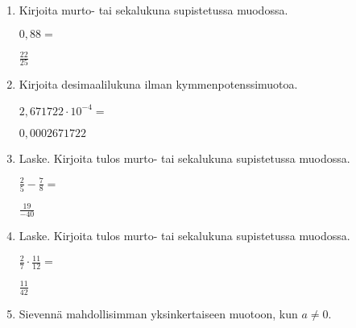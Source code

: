 \documentclass[finnish, a4paper, 12pt]{article}
\begin{document}
	\begin{enumerate}[leftmargin=*]
		\setlength\itemsep{1em}
		
		\item %
		Kirjoita murto- tai sekalukuna supistetussa muodossa. 
		
		\(
		0{,}88 = 
		\) %
		
		\begin{version:withAnswers}
		\( \frac{22}{25} \)
		\end{version:withAnswers}

		\vspace{8pt}
		
		\item %
		Kirjoita desimaalilukuna ilman kymmenpotenssimuotoa. 
		
		\(
		2{,}671722\cdot 10^{-4} = 
		\) %
		\begin{version:withAnswers}
		\( 0,0002671722 \)
		\end{version:withAnswers}	
		\vspace{8pt}
		
		\item %
		Laske. Kirjoita tulos murto- tai sekalukuna supistetussa muodossa.
		
		\(
		\displaystyle
		\frac{2}{5}-\frac{7}{8} = 
		\) %
		\begin{version:withAnswers}
		\( \frac{19}{-40} \)
		\end{version:withAnswers}	
		
		\vspace{8pt}
		
		\item %
		Laske. Kirjoita tulos murto- tai sekalukuna supistetussa muodossa.
		
		\(
		\displaystyle
		\frac{2}{7}\cdot\frac{11}{12} = 
		\) %
		\begin{version:withAnswers}
		\( \frac{11}{42} \)
		\end{version:withAnswers}
		
		\vspace{8pt}
		
		\item %
		Sievennä mahdollisimman yksinkertaiseen muotoon, kun \(a \not = 0\). 
		

\end{enumerate}
\end{document}
